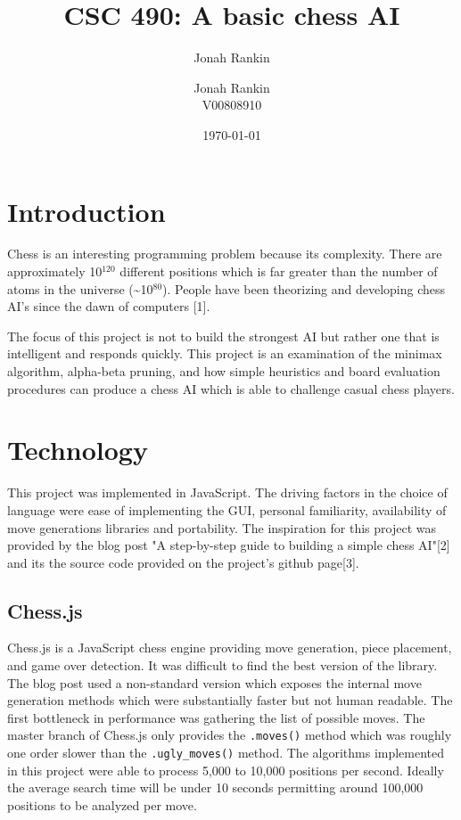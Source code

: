 \documentclass[11pt]{article}
\author{Jonah Rankin}
\date{\today}
\title{}
\begin{document}
\title{CSC 490: A basic chess AI}
\author{Jonah Rankin\\V00808910}
\maketitle

\section*{Introduction}
\label{sec:orgce42f24}
Chess is an interesting programming problem because its complexity. There are approximately 10\(^{\text{120}}\) different positions which is far greater than the number of atoms in the universe (\textasciitilde{}10\(^{\text{80}}\)). People have been theorizing and developing chess AI's since the dawn of computers [1].

The focus of this project is not to build the strongest AI but rather one that is intelligent and responds quickly. This project is an examination of the minimax algorithm, alpha-beta pruning, and how simple heuristics and board evaluation procedures can produce a chess AI which is able to challenge casual chess players.

\section*{Technology}
\label{sec:org98506bd}
This project was implemented in JavaScript. The driving factors in the choice of language were ease of implementing the GUI, personal familiarity, availability of move generations libraries and portability. The inspiration for this project was provided by the blog post "A step-by-step guide to building a simple chess AI"[2] and its the source code provided on the project's github page[3]. 

\subsection*{Chess.js}
\label{sec:org44f88e8}
Chess.js is a JavaScript chess engine providing move generation, piece placement, and game over detection. It was difficult to find the best version of the library. The blog post used a non-standard version which exposes the internal move generation methods which were substantially faster but not human readable. The first bottleneck in performance was gathering the list of possible moves. The master branch of Chess.js only provides the \texttt{.moves()} method which was roughly one order slower than the \texttt{.ugly\_moves()} method. The algorithms implemented in this project were able to process 5,000 to 10,000 positions per second. Ideally the average search time will be under 10 seconds permitting around 100,000 positions to be analyzed per move.
\end{document}
